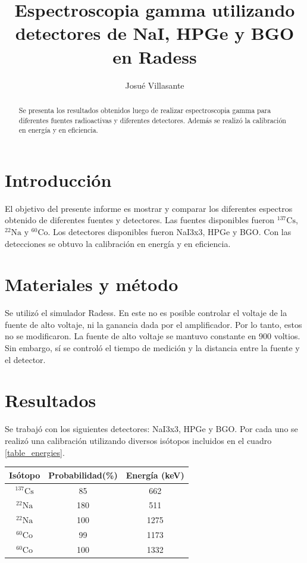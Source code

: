 \documentclass[a4paper, onecolumn]{article}
\author{Josué Villasante}
\title{Espectroscopia gamma utilizando detectores de NaI, HPGe y BGO en Radess}
\begin{document}
	\maketitle
	\begin{abstract}
		Se presenta los resultados obtenidos luego de realizar espectroscopia gamma para diferentes fuentes radioactivas y diferentes detectores. Además se realizó la calibración en energía y en eficiencia.
	\end{abstract}

	\section{Introducción}
		El objetivo del presente informe es mostrar y comparar los diferentes espectros obtenido de diferentes fuentes y detectores. Las fuentes disponibles fueron ${}^{137}\mathrm{Cs}$, ${}^{22}\mathrm{Na}$ y ${}^{60}\mathrm{Co}$. Los detectores disponibles fueron NaI3x3, HPGe y BGO. Con las detecciones se obtuvo la calibración en energía y en eficiencia.
	\section{Materiales y método}
		Se utilizó el simulador Radess. En este no es posible controlar el voltaje de la fuente de alto voltaje, ni la ganancia dada por el amplificador. Por lo tanto, estos no se modificaron. La fuente de alto voltaje se mantuvo constante en 900 voltios. Sin embargo, sí se controló el tiempo de medición y la distancia entre la fuente y el detector.

	\section{Resultados}	
		Se trabajó con los siguientes detectores: NaI3x3, HPGe y BGO. Por cada uno se realizó una calibración utilizando diversos isótopos incluidos en el cuadro \ref{table_energies}.

		\begin{center}
			{\renewcommand{\arraystretch}{1.5}
			\renewcommand{\tabcolsep}{0.2cm}
			\label{table_energies}
			\begin{tabular}{ c c c }
				\hline
				Isótopo & Probabilidad(\%) & Energía (keV) \\
				\hline
				${}^{137}\mathrm{Cs}$ & 85 & 662 \\ 
				${}^{22}\mathrm{Na}$ & 180 & 511 \\ 
				${}^{22}\mathrm{Na}$ & 100 & 1275 \\ 
				${}^{60}\mathrm{Co}$ & 99 & 1173 \\ 
				${}^{60}\mathrm{Co}$ & 100 & 1332
			\end{tabular}}
		\end{center}
\end{document}
